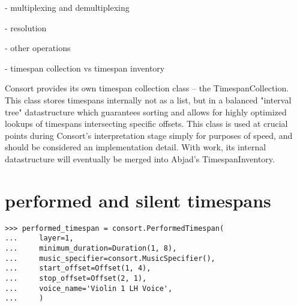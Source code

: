 - multiplexing and demultiplexing

- resolution

- other operations

\begin{comment}
TimespanInventory.all_are_contiguous
TimespanInventory.all_are_nonoverlapping
TimespanInventory.clip_timespan_durations
TimespanInventory.count_offsets()
TimespanInventory.explode()
TimespanInventory.round_offsets()
\end{comment}

- timespan collection vs timespan inventory

Consort provides its own timespan collection class -- the TimespanCollection.
This class stores timespans internally not as a list, but in a balanced
"interval tree" datastructure which guarantees sorting and allows for highly
optimized lookups of timespans intersecting specific offsets. This class is
used at crucial points during Consort's interpretation stage simply for
purposes of speed, and should be considered an implementation detail. With
work, its internal datastructure will eventually be merged into Abjad's
TimespanInventory.

\section{performed and silent timespans}

\begin{comment}
<abjad>
performed_timespan = consort.PerformedTimespan(
    layer=1,
    minimum_duration=Duration(1, 8),
    music_specifier=consort.MusicSpecifier(),
    start_offset=Offset(1, 4),
    stop_offset=Offset(2, 1),
    voice_name='Violin 1 LH Voice',
    )
</abjad>
\end{comment}

\begin{singlespacing}
\begin{lstlisting}
>>> performed_timespan = consort.PerformedTimespan(
...     layer=1,
...     minimum_duration=Duration(1, 8),
...     music_specifier=consort.MusicSpecifier(),
...     start_offset=Offset(1, 4),
...     stop_offset=Offset(2, 1),
...     voice_name='Violin 1 LH Voice',
...     )
\end{lstlisting}
\end{singlespacing}

\begin{comment}
<abjad>
silent_timespan = consort.SilentTimespan(
    layer=2,
    start_offset=Offset(0, 1),
    stop_offset=Offset(1, 4),
    voice_name='Violin 1 LH Voice',
    )
</abjad>
\end{comment}

